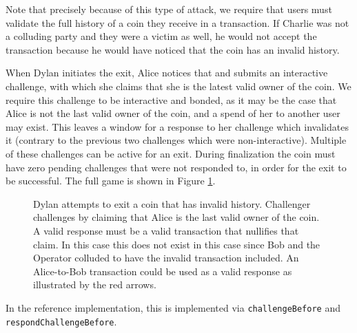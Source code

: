 Note that precisely because of this type of attack, we require that users must validate the full history of a coin they receive in a transaction. If Charlie was not a colluding party and they were a victim as well, he would not accept the transaction because he would have noticed that the coin has an invalid history.

When Dylan initiates the exit, Alice notices that and submits an interactive
challenge, with which she claims that she is the latest valid owner of the coin.
We require this challenge to be interactive and bonded, as it may be the case
that Alice is not the last valid owner of the coin, and a spend of her to another user may exist. 
This leaves a window for a response to her challenge which invalidates it 
(contrary to the previous two challenges which were non-interactive). Multiple of these challenges can be active for an exit. During finalization the coin must have zero pending challenges that were not responded to, in order for the exit to be successful. The full
game is shown in Figure \ref{fig:challenge_before}.

\begin{figure}[H]
	\caption{
        Dylan attempts to exit a coin that has invalid history. Challenger
        challenges by claiming that Alice is the last valid owner of the coin. A
        valid response must be a valid transaction that nullifies that claim.
        In this case this does not exist in this case since Bob and the Operator
        colluded to have the invalid transaction included. An Alice-to-Bob
        transaction could be used as a valid response as illustrated by the red
        arrows.
    }
    \label{fig:challenge_before}
\end{figure}

In the reference implementation, this is implemented via \texttt{challengeBefore} and 
\texttt{respondChallengeBefore}.

